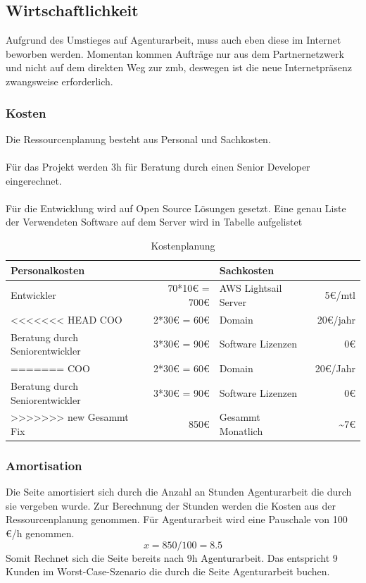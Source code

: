 \documentclass[11pt,a4paper]{article}
\begin{document}
\subsection{Wirtschaftlichkeit}
Aufgrund des Umstieges auf Agenturarbeit, muss auch eben diese im Internet beworben werden. Momentan kommen Aufträge nur aus dem Partnernetzwerk und nicht auf dem direkten Weg zur zmb, deswegen ist die neue Internetpräsenz zwangsweise erforderlich.
\subsubsection{Kosten}
Die Ressourcenplanung besteht aus Personal und Sachkosten.\\\\
Für das Projekt werden 3h für Beratung durch einen Senior Developer eingerechnet.\\\\
Für die Entwicklung wird auf Open Source Lösungen gesetzt. Eine genau Liste der Verwendeten Software auf dem Server wird in Tabelle \pageref{sec:progs} aufgelistet
\begin{table}[!ht]
  \centering
     \begin{tabular}{l|r||l|r}
       \textbf{Personalkosten}  & &\textbf{Sachkosten}& \\
       \hline
       Entwickler      &    70*10€ = 700€    &  AWS Lightsail Server      &     5€/mtl\\
<<<<<<< HEAD
       COO    &  2*30€ = 60€               	    &  Domain & 20€/jahr\\
       Beratung durch Seniorentwickler    &  3*30€ = 90€ & Software Lizenzen & 0€	\\
=======
       COO    &  2*30€ = 60€               	    &  Domain & 20€/Jahr\\
       Beratung durch Seniorentwickler    &  3*30€ = 90€ & Software Lizenzen & 0€	\\ 
>>>>>>> new
       \hline
       \hline
       Gesammt Fix& 850€ & Gesammt Monatlich & \textasciitilde 7€  \\
     \end{tabular}
\caption{Kostenplanung}
\label{tbl:Kostenplanung}
\end{table}
\subsubsection{Amortisation}
Die Seite amortisiert sich durch die Anzahl an Stunden Agenturarbeit die durch sie vergeben wurde.
Zur Berechnung der Stunden werden die Kosten aus der Ressourcenplanung genommen. Für Agenturarbeit wird eine  Pauschale von 100 €/h genommen.\\
\begin{equation*}
x = 850 / 100 = 8.5
\end{equation*}
Somit Rechnet sich die Seite bereits nach 9h Agenturarbeit. Das entspricht 9 Kunden im Worst-Case-Szenario die durch die Seite Agenturarbeit buchen.
\end{document}
